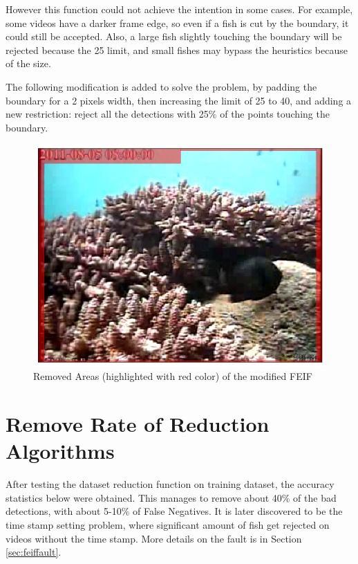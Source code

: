 \documentclass[bsc,logo,twoside,fullspacing,parskip]{infthesis}
\begin{document}
However this function could not achieve the intention in some cases. 
For example, some videos have a darker frame edge, so even if a fish is cut by the boundary, it could still be accepted. 
Also, a large fish slightly touching the boundary will be rejected because the 25 limit, and small fishes may bypass the heuristics because of the size.

The following modification is added to solve the problem, by padding the boundary for a 2 pixels width, then increasing the limit of 25 to 40, and adding a new restriction: reject all the detections with 25\% of the points touching the boundary. %

\begin{figure}[h]
\centering
    \includegraphics[scale=0.24]{graph/feifzone.png}
    \caption{Removed Areas (highlighted with red color) of the modified FEIF}
    \label{fig:feifzone}
\end{figure}

\section{Remove Rate of Reduction Algorithms}
\label{sec:reduction}

After testing the dataset reduction function on training dataset, the accuracy statistics below were obtained. This manages to remove about 40\% of the bad detections, with about 5-10\% of False Negatives. It is later discovered to be the time stamp setting problem, where significant amount of fish get rejected on videos without the time stamp. More details on the fault is in Section \ref{sec:feiffault}.
\end{document}

